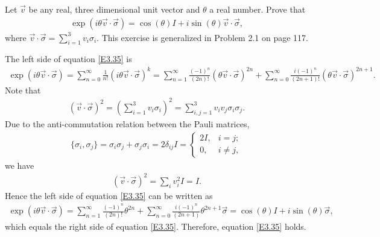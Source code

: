 \documentclass[en]{sol-man}
\begin{document}
\begin{exe}
    Let $\vec{v}$ be any real, three dimensional unit vector and $\theta$ a real number. Prove that
    \begin{align}
        \label{E3.35}
        \exp(i\theta\vec{v}\cdot\vec{\sigma})=\cos(\theta)I+i\sin(\theta)\vec{v}\cdot\vec{\sigma},
    \end{align}
    where $\vec{v}\cdot\vec{\sigma}=\sum_{i=1}^3v_i\sigma_i$. This exercise is generalized in Problem 2.1 on page 117.
\end{exe}
\begin{pf}
    The left side of equation \eqref{E3.35} is
    \begin{align}
        \exp(i\theta\vec{v}\cdot\vec{\sigma})=\sum_{n=0}^{\infty}\frac{1}{n!}(i\theta\vec{v}\cdot\vec{\sigma})^k=\sum_{n=1}^{\infty}\frac{(-1)^n}{(2n)!}(\theta\vec{v}\cdot\vec{\sigma})^{2n}+\sum_{n=0}^{\infty}\frac{i(-1)^n}{(2n+1)!}(\theta\vec{v}\cdot\vec{\sigma})^{2n+1}.
    \end{align}
    Note that
    \begin{align}
        (\vec{v}\cdot\vec{\sigma})^2=\left(\sum_{i=1}^3v_i\sigma_i\right)^2=\sum_{i,j=1}^3v_iv_j\sigma_i\sigma_j.
    \end{align}
    Due to the anti-commutation relation between the Pauli matrices,
    \begin{align}
        \{\sigma_i,\sigma_j\}=\sigma_i\sigma_j+\sigma_j\sigma_i=2\delta_{ij}I=\left\{\begin{array}{ll}
            2I,&i=j;\\
            0,&i\neq j,
        \end{array}\right.
    \end{align}
    we have
    \begin{align}
        (\vec{v}\cdot\vec{\sigma})^2=\sum_iv_i^2I=I.
    \end{align}
    Hence the left side of equation \eqref{E3.35} can be written as
    \begin{align}
        \exp(i\theta\vec{v}\cdot\vec{\sigma})=\sum_{n=1}^{\infty}\frac{(-1)^n}{(2n)!}\theta^{2n}+\sum_{n=0}^{\infty}\frac{i(-1)^n}{(2n+1)}\theta^{2n+1}\vec{\sigma}=\cos(\theta)I+i\sin(\theta)\vec{\sigma},
    \end{align}
    which equals the right side of equation \eqref{E3.35}. Therefore, equation \eqref{E3.35} holds.
\end{pf}
\end{document}
